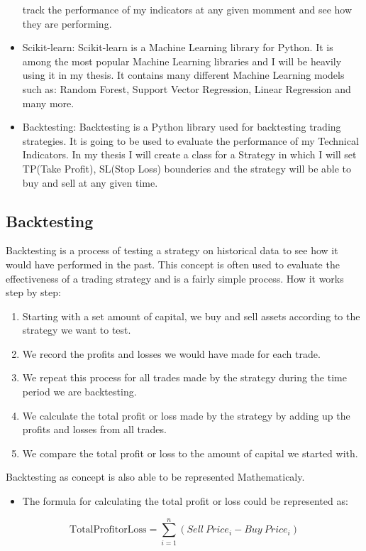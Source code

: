 \documentclass{imc-inf}
\begin{document}
\begin{itemize}
				track the performance of my indicators at any given momment and see how they are performing.
				\item Scikit-learn: Scikit-learn is a Machine Learning library for Python. It is among the most popular Machine Learning libraries and
				I will be heavily using it in my thesis. It contains many different Machine Learning models such as: Random Forest, Support Vector Regression, Linear Regression and many more.
				\item Backtesting: Backtesting is a Python library used for backtesting trading strategies. It is going to be used to evaluate the performance of my Technical Indicators.
				In my thesis I will create a class for a Strategy in which I will set TP(Take Profit), SL(Stop Loss) bounderies and the strategy will be able to buy and sell at any given time.
			\end{itemize}

		\subsection{Backtesting}
			Backtesting is a process of testing a strategy\cite{what_is_backtesting} on historical data to see how it would have performed in the past. 
			This concept is often used to evaluate the effectiveness of a trading strategy and is a fairly simple process. 
			How it works step by step:
			\begin{enumerate}
				\item Starting with a set amount of capital, we buy and sell assets according to the strategy we want to test.
				\item We record the profits and losses we would have made for each trade.
				\item We repeat this process for all trades made by the strategy during the time period we are backtesting.
				\item We calculate the total profit or loss made by the strategy by adding up the profits and losses from all trades.
				\item We compare the total profit or loss to the amount of capital we started with.
			\end{enumerate}

			Backtesting as concept is also able to be represented Mathematicaly.

			\begin{itemize}
				\item The formula for calculating the total profit or loss could be represented as:
			\end{itemize}
			\begin{equation}
				\mathrm{Total Profit or Loss} = \sum_{i=1}^{n} (Sell\ Price_i - Buy\ Price_i)
			\end{equation}
\end{document}
